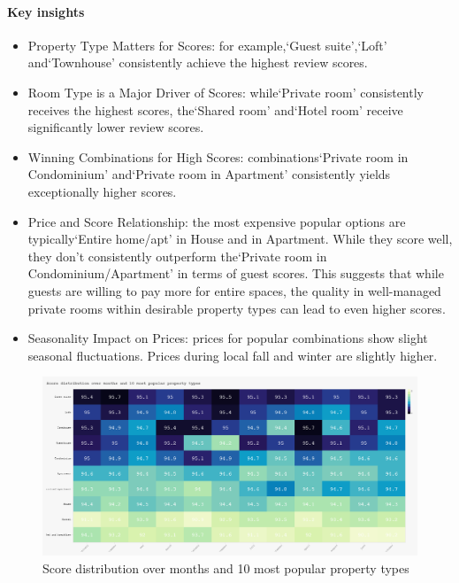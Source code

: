 \vspace{0.5em}
\paragraph{Key insights}
\begin{itemize}
    \item Property Type Matters for Scores: for example,`Guest suite',`Loft' and`Townhouse' consistently achieve the highest review scores.
    \item Room Type is a Major Driver of Scores: while`Private room' consistently receives the highest scores, the`Shared room' and`Hotel room' receive significantly lower review scores.
    \item Winning Combinations for High Scores: combinations`Private room in Condominium' and`Private room in Apartment' consistently yields exceptionally higher scores.
    \item Price and Score Relationship: the most expensive popular options are typically`Entire home/apt' in House and in Apartment. While they score well, they don't consistently outperform the`Private room in Condominium/Apartment' in terms of guest scores. This suggests that while guests are willing to pay more for entire spaces, the quality in well-managed private rooms within desirable property types can lead to even higher scores.
    \item Seasonality Impact on Prices: prices for popular combinations show slight seasonal fluctuations. Prices during local fall and winter are slightly higher.

\end{itemize}

\vspace{1em}
\begin{figure}[H]
    \centering
    \includegraphics[width=1\textwidth]{images/q4_1.jpg}
    \caption{Score distribution over months and 10 most popular property types}\label{fig:figureq5}
\end{figure}

